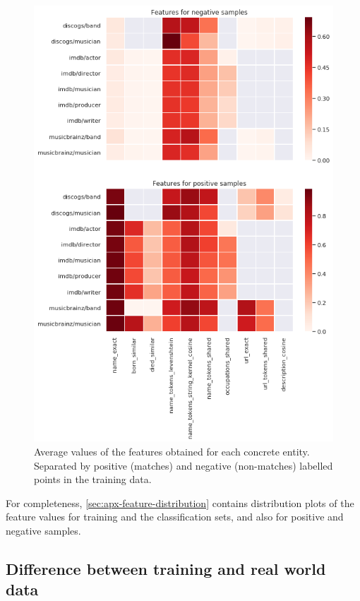\documentclass[epsfig,a4paper,11pt,titlepage,twoside,openany]{book}
\begin{document}
\begin{figure}[h]
  \centering \includegraphics[width=.8\textwidth]{feature_heatmap_training_positive_and_negative} 
  \caption{Average values of the features obtained for each concrete entity. Separated by positive (matches) and negative (non-matches) labelled points in the training data.}
  \label{fig:average-features-positive-negative}
\end{figure}


For completeness, \autoref{sec:apx-feature-distribution} contains distribution plots of the feature values for training and the classification sets, and also for positive and negative samples. 






\subsection{Difference between training and real world data}
\label{sec:training-real-data-difference}
\end{document}
